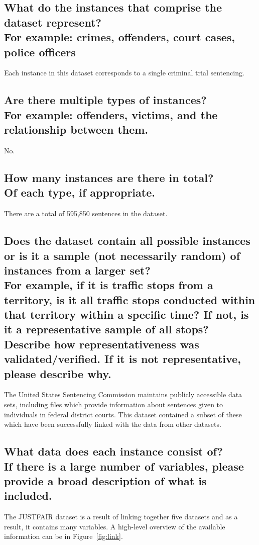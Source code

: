 \documentclass[letterpaper, 10 pt, conference]{ieeeconf}  %
\newcommand{\subtitle}[1]{{\\ \small \normalfont \color{purple} #1}}
\begin{document}
\subsection{What do the instances that comprise the dataset represent? \subtitle{For example: crimes, offenders, court cases, police officers}}

Each instance in this dataset corresponds to a single criminal trial sentencing.

\subsection{Are there multiple types of instances? \subtitle{For example: offenders, victims, and the relationship between them.}}

No.

\subsection{How many instances are there in total? \subtitle{Of each type, if appropriate.}}

There are a total of 595,850 sentences in the dataset.

\subsection{Does the dataset contain all possible instances or is it a sample (not necessarily random) of instances from a larger set? \subtitle{For example, if it is traffic stops from a territory, is it all traffic stops conducted within that territory within a specific time? If not, is it a representative sample of all stops? Describe how representativeness was validated/verified. If it is not representative, please describe why.}}

The United States Sentencing Commission maintains publicly accessible data sets, including files which provide information about sentences given to individuals in federal district courts. This dataset contained a subset of these which have been successfully linked with the data from other datasets.

\subsection{What data does each instance consist of? \subtitle{If there is a large number of variables, please provide a broad description of what is included.}}

The JUSTFAIR dataset is a result of linking together five datasets and as a result, it contains many variables. A high-level overview of the available information can be in Figure~\ref{fig:link}.
\end{document}
